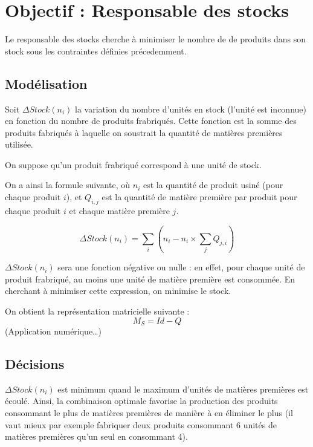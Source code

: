 \newpage
\section{Objectif : Responsable des stocks}
Le responsable des stocks cherche à minimiser le nombre de de produits dans
son stock sous les contraintes définies précedemment.

\subsection{Modélisation}
Soit $\Delta Stock(n_{i})$ la variation du nombre d'unités en stock (l'unité est
inconnue) en fonction du nombre de produits frabriqués. Cette fonction est la
somme des produits fabriqués à laquelle on soustrait la quantité de matières
premières utilisée.

On suppose qu'un produit frabriqué correspond à une unité de stock.

On a ainsi la formule suivante, où $n_{i}$ est la quantité de produit usiné
(pour chaque produit $i$), et $Q_{i,j}$ est la quantité de matière première par
produit pour chaque produit $i$ et chaque matière première $j$.

\begin{equation}
	\Delta Stock(n_{i}) = \sum_{i} (n_{i} - n_{i} \times \sum_{j} Q_{j,i})
\end{equation}

$\Delta Stock(n_{i})$ sera une fonction négative ou nulle : en effet, pour
chaque unité de produit frabriqué, au moins une unité de matière première est
consommée. En cherchant à minimiser cette expression, on minimise le stock.

On obtient la représentation matricielle suivante :
\begin{equation}
	M_{S} = Id - Q
\end{equation}
(Application numérique\ldots)

\subsection{Décisions}
$\Delta Stock(n_{i})$ est minimum quand le maximum d'unités de matières
premières est écoulé. Ainsi, la combinaison optimale favorise la production des
produits consommant le plus de matières premières de manière à en éliminer le
plus (il vaut mieux par exemple fabriquer deux produits consommant 6 unités de
matières premières qu'un seul en consommant 4).